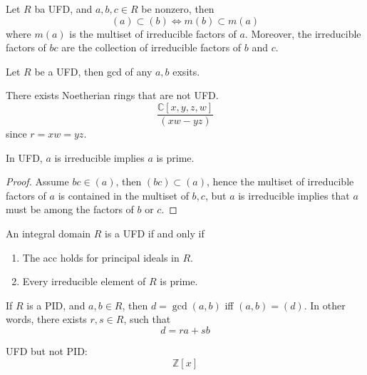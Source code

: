 \documentclass[openany]{book}
\newcommand{\Z}{\mathbb{Z}}
\newcommand{\C}{\mathbb{C}}
\begin{document}
\begin{prop}
    Let $R$ ba UFD, and $a,b,c\in R$ be nonzero, then 
    \begin{equation*}
        (a)\subset(b)\iff m(b)\subset m(a)
    \end{equation*}
    where $m(a)$ is the multiset of irreducible factors of $a$. Moreover, the irreducible factors of $bc$ are the collection of irreducible factors of $b$ and $c$.
\end{prop}



\begin{prop}
    Let $R$ be a UFD, then gcd of any $a,b$ exsits.
\end{prop}
\begin{example}
    There exists Noetherian rings that are not UFD.
    \begin{equation*}
        \frac{\C[x,y,z,w]}{(xw-yz)}
    \end{equation*}
    since $r=xw=yz$.
\end{example}


\begin{prop}
    In UFD, $a$ is irreducible implies $a$ is prime.
\end{prop}
\begin{proof}
    Assume $bc\in (a)$, then $(bc)\subset (a)$, hence the multiset of irreducible factors of $a$ is contained in the multiset of $b,c$, but $a$ is irreducible implies that $a$ must be among the factors of $b$ or $c$.
\end{proof}


\begin{thm}
    An integral domain $R$ is a UFD if and only if 
    \begin{enumerate}
        \item The acc holds for principal ideals in $R$.
        \item Every irreducible element of $R$ is prime.
    \end{enumerate}
\end{thm}

\begin{thm}
    If $R$ is a PID, and $a,b\in R$, then $d=\gcd(a,b)$ iff $(a,b)=(d)$. In other words, there exists $r,s\in R$, such that 
    \begin{equation*}
        d=ra+sb
    \end{equation*}
\end{thm}


\begin{example}
    UFD but not PID:
    \begin{equation*}
        \Z[x]
    \end{equation*}
\end{example}
\end{document}
